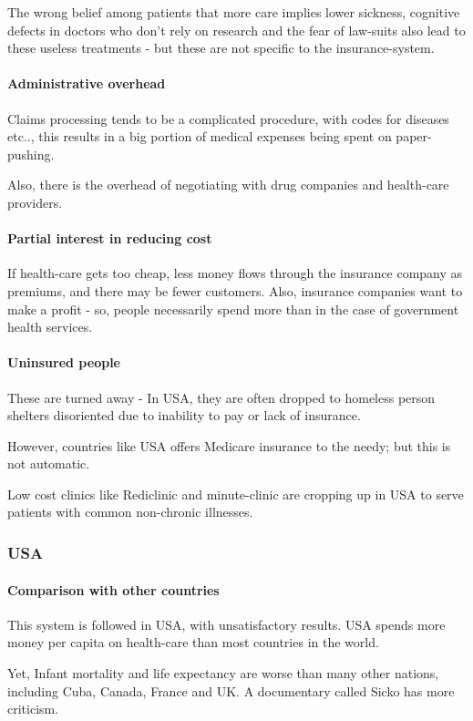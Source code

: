 \documentclass[oneside, article]{memoir}
\begin{document}
The wrong belief among patients that more care implies lower sickness, cognitive defects in doctors who don't rely on research and the fear of law-suits also lead to these useless treatments - but these are not specific to the insurance-system.

\paragraph{Administrative overhead}
Claims processing tends to be a complicated procedure, with codes for diseases etc.., this results in a big portion of medical expenses being spent on paper-pushing.

Also, there is the overhead of negotiating with drug companies and health-care providers.

\paragraph{Partial interest in reducing cost}
If health-care gets too cheap, less money flows through the insurance company as premiums, and there may be fewer customers. Also, insurance companies want to make a profit - so, people necessarily spend more than in the case of government health services.

\paragraph{Uninsured people}
These are turned away - In USA, they are often dropped to homeless person shelters disoriented due to inability to pay or lack of insurance.

However, countries like USA offers Medicare insurance to the needy; but this is not automatic.

Low cost clinics like Rediclinic and minute-clinic are cropping up in USA to serve patients with common non-chronic illnesses.

\subsubsection{USA}
\paragraph{Comparison with other countries}
This system is followed in USA, with unsatisfactory results. USA spends more money per capita on health-care than most countries in the world.

Yet, Infant mortality and life expectancy are worse than many other nations, including Cuba, Canada, France and UK. A documentary called Sicko has more criticism.
\end{document}
